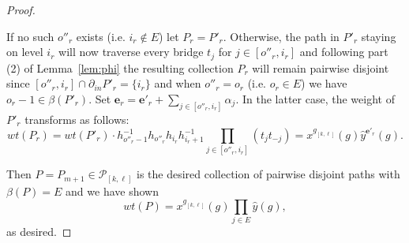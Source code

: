 \documentclass[12pt]{amsart}
\newcommand{\bfe}{\mathbf{e}}
\newcommand{\cP}{\mathcal{P}}
\theoremstyle{remark}
\numberwithin{equation}{section}
\begin{document}
\begin{proof}
\begin{itemize}
  If no such $o''_r$ exists (i.e. $i_r\notin E$) let $P_r=P'_r$.  
  Otherwise, the path in $P'_r$ staying on level $i_r$ will now traverse every bridge $t_j$ for $j\in[o''_r,i_r]$ and following part (2) of Lemma~\ref{lem:phi} the resulting collection $P_r$ will remain pairwise disjoint since $[o''_r,i_r]\cap\partial_{in}P'_r=\{i_r\}$ and when $o''_r=o_r$ (i.e. $o_r\in E$) we have $o_r-1\in\beta(P'_r)$.  
  Set $\bfe_r=\bfe'_r+\sum\limits_{j\in[o''_r,i_r]}\alpha_j$.
  In the latter case, the weight of $P'_r$ transforms as follows: 
  \[wt(P_r)=wt(P'_r)\cdot h_{o''_r-1}^{-1}h_{o''_r}h_{i_r}h_{i_r+1}^{-1}\prod_{j\in[o''_r,i_r]}(t_jt_{-j})=x^{g_{[k,\ell]}}(g)\hat y^{\bfe'_r}(g).\]
\end{itemize}
Then $P=P_{m+1}\in\cP_{[k,\ell]}$ is the desired collection of pairwise disjoint paths with $\beta(P)=E$ and we have shown 
\[wt(P)=x^{g_{[k,\ell]}}(g)\prod_{j\in E}\hat y(g),\]
as desired.
\end{proof}
\end{document}
